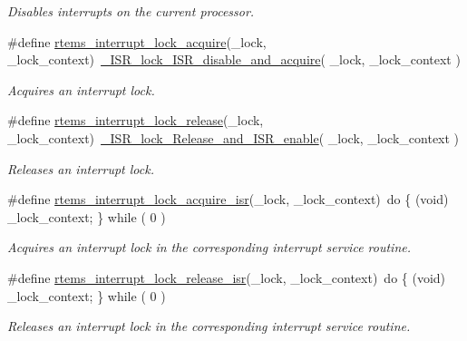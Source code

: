 \begin{DoxyCompactItemize}
\begin{DoxyCompactList}\small\item\em Disables interrupts on the current processor. \end{DoxyCompactList}\item 
\#define \mbox{\hyperlink{group__ClassicINTRLocks_ga0eeb7f40f9ac9e9c7b092d5fd85b5b3c}{rtems\+\_\+interrupt\+\_\+lock\+\_\+acquire}}(\+\_\+lock,  \+\_\+lock\+\_\+context)~\mbox{\hyperlink{group__RTEMSScoreISRLocks_gaa4ecfcd40e90531bdd3c348a99b3b7d9}{\+\_\+\+I\+S\+R\+\_\+lock\+\_\+\+I\+S\+R\+\_\+disable\+\_\+and\+\_\+acquire}}( \+\_\+lock, \+\_\+lock\+\_\+context )
\begin{DoxyCompactList}\small\item\em Acquires an interrupt lock. \end{DoxyCompactList}\item 
\#define \mbox{\hyperlink{group__ClassicINTRLocks_gaefc0c78feded09af9fd5b3ed93262f97}{rtems\+\_\+interrupt\+\_\+lock\+\_\+release}}(\+\_\+lock,  \+\_\+lock\+\_\+context)~\mbox{\hyperlink{group__RTEMSScoreISRLocks_ga87a2125e8bfba5f2f5b72adbeee4dcc3}{\+\_\+\+I\+S\+R\+\_\+lock\+\_\+\+Release\+\_\+and\+\_\+\+I\+S\+R\+\_\+enable}}( \+\_\+lock, \+\_\+lock\+\_\+context )
\begin{DoxyCompactList}\small\item\em Releases an interrupt lock. \end{DoxyCompactList}\item 
\#define \mbox{\hyperlink{group__ClassicINTRLocks_gacd04eb0d7343b27b1c0c918c4330769c}{rtems\+\_\+interrupt\+\_\+lock\+\_\+acquire\+\_\+isr}}(\+\_\+lock,  \+\_\+lock\+\_\+context)~do \{ (void) \+\_\+lock\+\_\+context; \} while ( 0 )
\begin{DoxyCompactList}\small\item\em Acquires an interrupt lock in the corresponding interrupt service routine. \end{DoxyCompactList}\item 
\#define \mbox{\hyperlink{group__ClassicINTRLocks_ga364753238832da99e0ef670ba346c659}{rtems\+\_\+interrupt\+\_\+lock\+\_\+release\+\_\+isr}}(\+\_\+lock,  \+\_\+lock\+\_\+context)~do \{ (void) \+\_\+lock\+\_\+context; \} while ( 0 )
\begin{DoxyCompactList}\small\item\em Releases an interrupt lock in the corresponding interrupt service routine. \end{DoxyCompactList}\end{DoxyCompactItemize}
